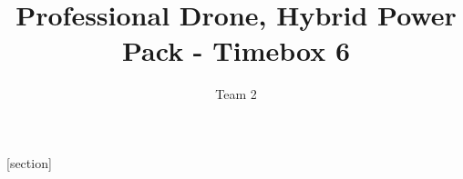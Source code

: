 

\title{Professional Drone, Hybrid Power Pack  - Timebox 6}
\author{Team 2}






[section]\setcounter{udrboks}{0}
\renewcommand{\theudrboks}{\arabic{section}.\arabic{udrboks}}
\renewcommand{\theudrboks}{\arabic{udrboks}}
\newenvironment{udrboks}[2][]{%
  \refstepcounter{udrboks}%
  \ifstrempty{#1}%
  {\mdfsetup{%
      frametitle={%
        \tikz[baseline=(current bounding box.east),outer sep=0pt]
        \node[anchor=east,rectangle,fill=blue!20]
        {\strut Udregninger~\theudrboks};}}
  }%
  {\mdfsetup{%
      frametitle={%
        \tikz[baseline=(current bounding box.east),outer sep=0pt]
        \node[anchor=east,rectangle,fill=blue!20]
        {\strut Udregninger ~\theudrboks:~#1};}}%
  }%
  \mdfsetup{innertopmargin=10pt,linecolor=blue!20,%
    linewidth=2pt,topline=true,%
    frametitleaboveskip=\dimexpr-\ht\strutbox\relax
  }
  \begin{mdframed}[]\relax%
    \label{#2}}{\end{mdframed}}


